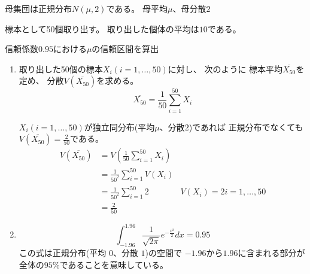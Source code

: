 \documentclass[12pt,b5paper]{ltjsarticle}
\begin{document}
母集団は正規分布$N(\mu,2)$である。
母平均$\mu$、母分散$2$

標本として50個取り出す。
取り出した個体の平均は$10$である。

信頼係数$0.95$における$\mu$の信頼区間を算出



\begin{enumerate}\renewcommand{\theenumi}{(\arabic{enumi})}
 \item
      取り出した50個の標本$X_i (i=1,\dots,50)$に対し、
      次のように
      標本平均$\overline{X_{50}}$を定め、
      分散$V(\overline{X_{50}})$を求める。
      \[
       \overline{X_{50}}=\frac{1}{50}\sum_{i=1}^{50}X_i
      \]

      $X_i (i=1,\dots,50)$が独立同分布(平均$\mu$、分散$2$)であれば
      正規分布でなくても$V(\overline{X_{50}}) = \frac{2}{50}$である。
      \begin{align}
       V(\overline{X_{50}}) & = V\left(\frac{1}{50}\sum_{i=1}^{50}X_i\right)\\
       & = \frac{1}{50^2}\sum_{i=1}^{50}V(X_i)\\
       & = \frac{1}{50^2}\sum_{i=1}^{50}2 & V(X_i)=2 i=1,\dots,50\\
       & = \frac{2}{50}
      \end{align}
 \item
      \[
       \int_{-1.96}^{1.96}\frac{1}{\sqrt{2\pi}}e^{-\frac{x^2}{2}}dx = 0.95
      \]
      この式は正規分布(平均 $0$、分散 $1$)の空間で
      $-1.96$から$1.96$に含まれる部分が全体の$95\%$であることを意味している。

      
\end{enumerate}
\end{document}
